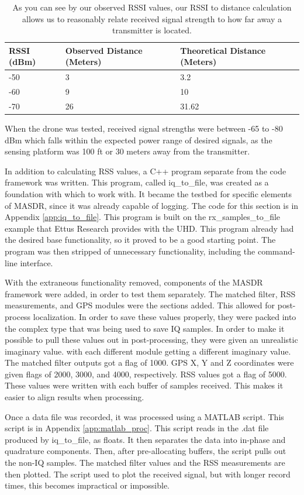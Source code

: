 \begin{table}[ht]
\centering
\label{table:RSSI_Results}
\begin{tabular}{|l|l|l|} \hline
  RSSI (dBm) & Observed Distance (Meters) & Theoretical Distance (Meters) \\ \hline
  -50 & 3 & 3.2 \\
  -60 & 9 & 10 \\
  -70 & 26 & 31.62 \\ \hline
\end{tabular}
\caption{As you can see by our observed RSSI values, our RSSI to distance calculation allows us to reasonably relate received signal strength to how far away a transmitter is located.}
\end{table}\par

When the drone was tested, received signal strengths were between -65 to -80 dBm which falls within the expected power range of desired signals, as the sensing platform was 100 ft or 30 meters away from the transmitter. 

In addition to calculating RSS values, a C++ program separate from the code framework
was written. This program, called iq\_to\_file, was created as a foundation with 
which to work with. It became the testbed for specific elements of MASDR, since it
was already capable of logging. The code for this section is in Appendix \ref{app:iq_to_file}. 
This program is built on the rx\_samples\_to\_file example that Ettus Research provides 
with the UHD. This program already had the desired base functionality, so it proved
to be a good starting point. The program was then stripped of unnecessary functionality,
including the command-line interface. \par
With the extraneous functionality removed, components of the MASDR framework were
added, in order to test them separately. The matched filter, RSS measurements, 
and GPS modules were the sections added. This allowed for post-process localization. In order to 
save these values properly, they were packed into the complex type that was being
used to save IQ samples. In order to make it possible to pull these values out
in post-processing, they were given an unrealistic imaginary value. with each different 
module getting a different imaginary value. The matched filter outputs got 
a flag of 1000. GPS X, Y and Z coordinates were given flags of 2000, 3000, and 4000,
respectively. RSS values got a flag of 5000. These values were written with each 
buffer of samples received. This makes it easier to align results when processing.\par
Once a data file was recorded, it was processed using a MATLAB script. This script 
is in Appendix \ref{app:matlab_proc}. This script reads in the .dat file produced 
by iq\_to\_file, as floats. It then separates the data into in-phase and quadrature
components. Then, after pre-allocating buffers, the script pulls out the non-IQ 
samples. The matched filter values and the RSS measurements are then plotted. The
script used to plot the received signal, but with longer record times, this
becomes impractical or impossible.

